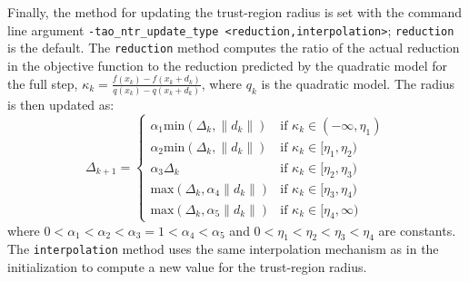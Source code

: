 Finally, the method for updating the trust-region radius is set with the 
command line argument 
{\tt -tao\_ntr\_update\_type <reduction,interpolation>}; {\tt reduction} 
is the default.  The {\tt reduction} method computes the ratio of the 
actual reduction in the objective function to the reduction predicted 
by the quadratic model for the full step, 
$\kappa_k = \frac{f(x_k) - f(x_k + d_k)}{q(x_k) - q(x_k + d_k)}$, where 
$q_k$ is the quadratic model.  The radius is then updated as:
\[
\Delta_{k+1} = \left\{\begin{array}{ll}
\alpha_1 \mbox{min}(\Delta_k, \|d_k\|) & \mbox{if } \kappa_k \in (-\infty, \eta_1) \\
\alpha_2 \mbox{min}(\Delta_k, \|d_k\|) & \mbox{if } \kappa_k \in [\eta_1, \eta_2) \\
\alpha_3 \Delta_k & \mbox{if } \kappa_k \in [\eta_2, \eta_3) \\
\mbox{max}(\Delta_k, \alpha_4 \|d_k\|) & \mbox{if } \kappa_k \in [\eta_3, \eta_4) \\
\mbox{max}(\Delta_k, \alpha_5 \|d_k\|) & \mbox{if } \kappa_k \in [\eta_4, \infty)
\end{array}
\right.
\]
where $0 < \alpha_1 < \alpha_2 < \alpha_3 = 1 < \alpha_4 < \alpha_5$ and
$0 < \eta_1 < \eta_2 < \eta_3 < \eta_4$ are constants.  The {\tt interpolation}
method uses the same interpolation mechanism as in the initialization to
compute a new value for the trust-region radius.


